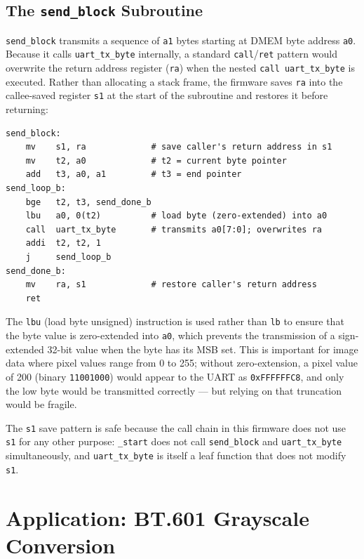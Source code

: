 \subsection{The \texttt{send\_block} Subroutine}
\label{sec:send_block}

\texttt{send\_block} transmits a sequence of \texttt{a1} bytes starting at DMEM
byte address \texttt{a0}. Because it calls \texttt{uart\_tx\_byte} internally, a
standard \texttt{call}/\texttt{ret} pattern would overwrite the return address register
(\texttt{ra}) when the nested \texttt{call uart\_tx\_byte} is executed. Rather than
allocating a stack frame, the firmware saves \texttt{ra} into the callee-saved register
\texttt{s1} at the start of the subroutine and restores it before returning:

\begin{lstlisting}[language=RISCV, caption={send\_block: send a1 bytes from DMEM address a0 via UART}]
send_block:
    mv    s1, ra             # save caller's return address in s1
    mv    t2, a0             # t2 = current byte pointer
    add   t3, a0, a1         # t3 = end pointer
send_loop_b:
    bge   t2, t3, send_done_b
    lbu   a0, 0(t2)          # load byte (zero-extended) into a0
    call  uart_tx_byte       # transmits a0[7:0]; overwrites ra
    addi  t2, t2, 1
    j     send_loop_b
send_done_b:
    mv    ra, s1             # restore caller's return address
    ret
\end{lstlisting}

The \texttt{lbu} (load byte unsigned) instruction is used rather than \texttt{lb} to
ensure that the byte value is zero-extended into \texttt{a0}, which prevents the
transmission of a sign-extended 32-bit value when the byte has its MSB set. This is
important for image data where pixel values range from 0 to 255; without zero-extension,
a pixel value of 200 (binary \texttt{11001000}) would appear to the UART as
\texttt{0xFFFFFFC8}, and only the low byte would be transmitted correctly — but relying
on that truncation would be fragile.

The \texttt{s1} save pattern is safe because the call chain in this firmware does not
use \texttt{s1} for any other purpose: \texttt{\_start} does not call \texttt{send\_block}
and \texttt{uart\_tx\_byte} simultaneously, and \texttt{uart\_tx\_byte} is itself a leaf
function that does not modify \texttt{s1}.

\section{Application: BT.601 Grayscale Conversion}
\label{sec:bt601}

